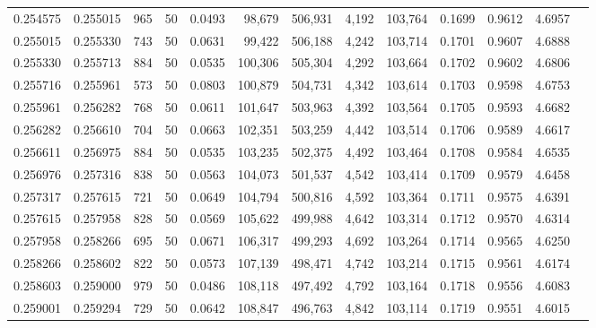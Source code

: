 \begin{tabular}{rrrrrrrrrrrrr}
0.254575 & 0.255015 &   965 &  50 &                                     0.0493 &  98,679 & 506,931 &   4,192 & 103,764 & 0.1699 & 0.9612 & 4.6957 \\
0.255015 & 0.255330 &   743 &  50 &                                     0.0631 &  99,422 & 506,188 &   4,242 & 103,714 & 0.1701 & 0.9607 & 4.6888 \\
0.255330 & 0.255713 &   884 &  50 &                                     0.0535 & 100,306 & 505,304 &   4,292 & 103,664 & 0.1702 & 0.9602 & 4.6806 \\
0.255716 & 0.255961 &   573 &  50 &                                     0.0803 & 100,879 & 504,731 &   4,342 & 103,614 & 0.1703 & 0.9598 & 4.6753 \\
0.255961 & 0.256282 &   768 &  50 &                                     0.0611 & 101,647 & 503,963 &   4,392 & 103,564 & 0.1705 & 0.9593 & 4.6682 \\
0.256282 & 0.256610 &   704 &  50 &                                     0.0663 & 102,351 & 503,259 &   4,442 & 103,514 & 0.1706 & 0.9589 & 4.6617 \\
0.256611 & 0.256975 &   884 &  50 &                                     0.0535 & 103,235 & 502,375 &   4,492 & 103,464 & 0.1708 & 0.9584 & 4.6535 \\
0.256976 & 0.257316 &   838 &  50 &                                     0.0563 & 104,073 & 501,537 &   4,542 & 103,414 & 0.1709 & 0.9579 & 4.6458 \\
0.257317 & 0.257615 &   721 &  50 &                                     0.0649 & 104,794 & 500,816 &   4,592 & 103,364 & 0.1711 & 0.9575 & 4.6391 \\
0.257615 & 0.257958 &   828 &  50 &                                     0.0569 & 105,622 & 499,988 &   4,642 & 103,314 & 0.1712 & 0.9570 & 4.6314 \\
0.257958 & 0.258266 &   695 &  50 &                                     0.0671 & 106,317 & 499,293 &   4,692 & 103,264 & 0.1714 & 0.9565 & 4.6250 \\
0.258266 & 0.258602 &   822 &  50 &                                     0.0573 & 107,139 & 498,471 &   4,742 & 103,214 & 0.1715 & 0.9561 & 4.6174 \\
0.258603 & 0.259000 &   979 &  50 &                                     0.0486 & 108,118 & 497,492 &   4,792 & 103,164 & 0.1718 & 0.9556 & 4.6083 \\
0.259001 & 0.259294 &   729 &  50 &                                     0.0642 & 108,847 & 496,763 &   4,842 & 103,114 & 0.1719 & 0.9551 & 4.6015 \\

\end{tabular}
